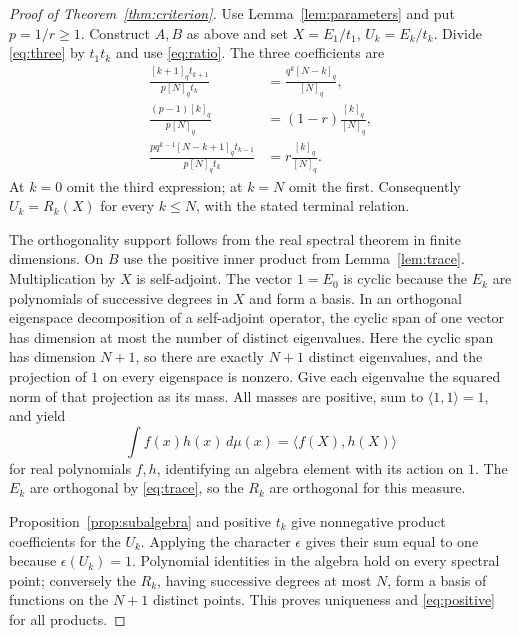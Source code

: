 \begin{proof}[Proof of Theorem~\ref{thm:criterion}]
Use Lemma~\ref{lem:parameters} and put $p=1/r\geq1$. Construct $A,B$ as above and set $X=E_1/t_1$, $U_k=E_k/t_k$. Divide \eqref{eq:three} by $t_1t_k$ and use \eqref{eq:ratio}. The three coefficients are
\begin{align*}
\frac{[k+1]_qt_{k+1}}{p[N]_qt_k}
&=\frac{q^k[N-k]_q}{[N]_q},\\
\frac{(p-1)[k]_q}{p[N]_q}&=(1-r)\frac{[k]_q}{[N]_q},\\
\frac{pq^{k-1}[N-k+1]_qt_{k-1}}{p[N]_qt_k}
&=r\frac{[k]_q}{[N]_q}.
\end{align*}
At $k=0$ omit the third expression; at $k=N$ omit the first. Consequently $U_k=R_k(X)$ for every $k\leq N$, with the stated terminal relation.

The orthogonality support follows from the real spectral theorem in finite dimensions. On $B$ use the positive inner product from Lemma~\ref{lem:trace}. Multiplication by $X$ is self-adjoint. The vector $1=E_0$ is cyclic because the $E_k$ are polynomials of successive degrees in $X$ and form a basis. In an orthogonal eigenspace decomposition of a self-adjoint operator, the cyclic span of one vector has dimension at most the number of distinct eigenvalues. Here the cyclic span has dimension $N+1$, so there are exactly $N+1$ distinct eigenvalues, and the projection of $1$ on every eigenspace is nonzero. Give each eigenvalue the squared norm of that projection as its mass. All masses are positive, sum to $\langle1,1\rangle=1$, and yield
\[
\int f(x)h(x)\,d\mu(x)=\langle f(X),h(X)\rangle
\]
for real polynomials $f,h$, identifying an algebra element with its action on $1$. The $E_k$ are orthogonal by \eqref{eq:trace}, so the $R_k$ are orthogonal for this measure.

Proposition~\ref{prop:subalgebra} and positive $t_k$ give nonnegative product coefficients for the $U_k$. Applying the character $\epsilon$ gives their sum equal to one because $\epsilon(U_k)=1$. Polynomial identities in the algebra hold on every spectral point; conversely the $R_k$, having successive degrees at most $N$, form a basis of functions on the $N+1$ distinct points. This proves uniqueness and \eqref{eq:positive} for all products.
\end{proof}

